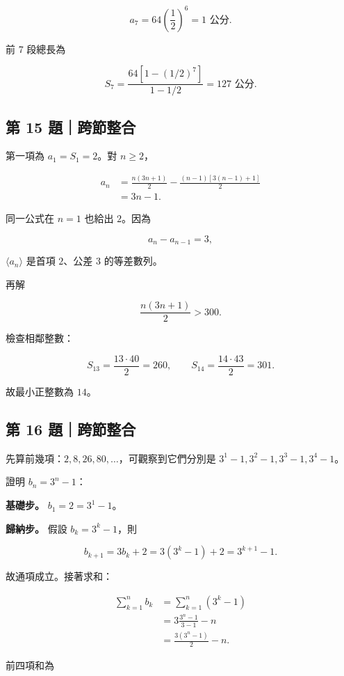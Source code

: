 \documentclass[11pt,a4paper]{article}
\begin{document}
\[
a_7=64\left(\frac12\right)^6=1\text{ 公分}.
\]

前 7 段總長為

\[
S_7=\frac{64[1-(1/2)^7]}{1-1/2}=127\text{ 公分}.
\]

\subsection{第 15 題｜跨節整合}\label{ux7b2c-15-ux984cux8de8ux7bc0ux6574ux5408}

第一項為 \(a_1=S_1=2\)。對 \(n\ge2\)，

\[
\begin{aligned}
a_n
&=\frac{n(3n+1)}2-\frac{(n-1)[3(n-1)+1]}2\\
&=3n-1.
\end{aligned}
\]

同一公式在 \(n=1\) 也給出 \(2\)。因為

\[
a_n-a_{n-1}=3,
\]

\(\langle a_n\rangle\) 是首項 \(2\)、公差 \(3\) 的等差數列。

再解

\[
\frac{n(3n+1)}2>300.
\]

檢查相鄰整數：

\[
S_{13}=\frac{13\cdot40}{2}=260,\qquad
S_{14}=\frac{14\cdot43}{2}=301.
\]

故最小正整數為 \(\boxed{14}\)。

\subsection{第 16 題｜跨節整合}\label{ux7b2c-16-ux984cux8de8ux7bc0ux6574ux5408}

先算前幾項：\(2,8,26,80,\ldots\)，可觀察到它們分別是 \(3^1-1,3^2-1,3^3-1,3^4-1\)。

證明 \(b_n=3^n-1\)：

\textbf{基礎步。} \(b_1=2=3^1-1\)。

\textbf{歸納步。} 假設 \(b_k=3^k-1\)，則

\[
b_{k+1}=3b_k+2=3(3^k-1)+2=3^{k+1}-1.
\]

故通項成立。接著求和：

\[
\begin{aligned}
\sum_{k=1}^{n}b_k
&=\sum_{k=1}^{n}(3^k-1)\\
&=3\frac{3^n-1}{3-1}-n\\
&=\boxed{\frac{3(3^n-1)}2-n}.
\end{aligned}
\]

前四項和為
\end{document}
